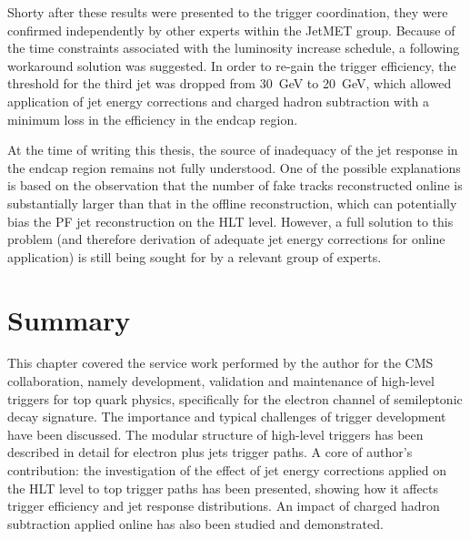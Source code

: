 Shorty after these results were presented to the trigger coordination, they were confirmed independently by other
experts within the JetMET group. Because of the time constraints associated with the luminosity increase schedule, a
following workaround solution was suggested. In order to re-gain the trigger efficiency, the threshold for the third jet
was dropped from \SI{30}{\GeV} to \SI{20}{\GeV}, which allowed application of jet energy corrections and charged hadron
subtraction with a minimum loss in the efficiency in the endcap region.

At the time of writing this thesis, the source of inadequacy of the jet response in the endcap region remains not fully
understood. One of the possible explanations is based on the observation that the number of fake tracks reconstructed
online is substantially larger than that in the offline reconstruction, which can potentially bias the PF jet
reconstruction on the HLT level. However, a full solution to this problem (and therefore derivation of adequate jet
energy corrections for online application) is still being sought for by a relevant group of experts.

\newpage
\section{Summary}
This chapter covered the service work performed by the author for the CMS collaboration, namely development, validation
and maintenance of high-level triggers for top quark physics, specifically for the electron channel of semileptonic
\ttbar decay signature. The importance and typical challenges of trigger development have been discussed. The modular
structure of high-level triggers has been described in detail for electron plus jets trigger paths. A core of author's
contribution: the investigation of the effect of jet energy corrections applied on the HLT level to top trigger paths
has been presented, showing how it affects trigger efficiency and jet response distributions. An impact of charged
hadron subtraction applied online has also been studied and demonstrated.



